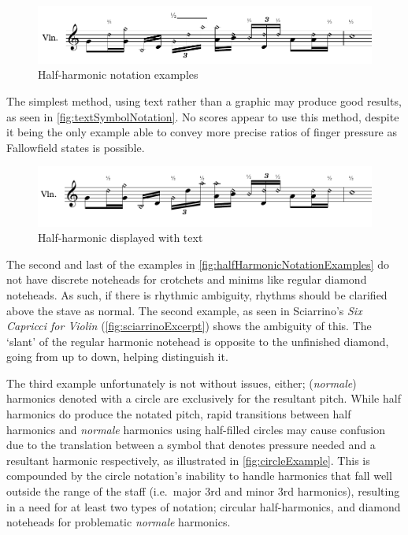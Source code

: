 \begin{figure}
    \includegraphics[width=\linewidth]{./resources/halfHarmonicNotationExamples.pdf}
    \caption{Half-harmonic notation examples}\label{fig:halfHarmonicNotationExamples}
\end{figure}

  
The simplest method, using text rather than a graphic may produce good results, as seen in \autoref{fig:textSymbolNotation}.
No scores appear to use this method, despite it being the only example able to convey more precise ratios of finger pressure as Fallowfield states is possible.\autocite[http://www.cellomap.com/index/the-string/multiphonics-and-other-multiple-sounds/other-multiple-sounds.html]{fallowfieldCelloMap}

\begin{figure}
  \includegraphics[page=1,width=\textwidth]{resources/halfharmonicsSingleExamples.pdf}
  \caption{Half-harmonic displayed with text}\label{fig:textSymbolNotation}
\end{figure}

The second and last of the examples in \autoref{fig:halfHarmonicNotationExamples} do not have discrete noteheads for crotchets and minims like regular diamond noteheads.
As such, if there is rhythmic ambiguity, rhythms should be clarified above the stave as normal.
The second example, as seen in Sciarrino's \emph{Six Capricci for Violin} (\autoref{fig:sciarrinoExcerpt}) shows the ambiguity of this.
The `slant' of the regular harmonic notehead is opposite to the unfinished diamond, going from up to down, helping distinguish it.

The third example unfortunately is not without issues, either; (\emph{normale}) harmonics denoted with a circle are exclusively for the resultant pitch.\autocite[419]{gouldBars2011} 
While half harmonics do produce the notated pitch, rapid transitions between half harmonics and \emph{normale} harmonics using half-filled circles may cause confusion due to the translation between a symbol that denotes pressure needed and a resultant harmonic respectively, as illustrated in \autoref{fig:circleExample}.
This is compounded by the circle notation's inability to handle harmonics that fall well outside the range of the staff (i.e.\ major 3rd and minor 3rd harmonics), resulting in a need for at least two types of notation; circular half-harmonics, and diamond noteheads for problematic \emph{normale} harmonics.

